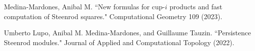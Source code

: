 
{
	\begin{frame}
		\vskip 5cm
		\begin{center}
		\end{center}

	\bigskip

	\footnotesize
	 Medina-Mardones, Anibal M. ``New formulas for cup-$i$ products and fast computation of Steenrod squares." Computational Geometry 109 (2023).

	\medskip
	 Umberto Lupo, Anibal M. Medina-Mardones, and Guillaume Tauzin. ``Persistence Steenrod modules." Journal of Applied and Computational Topology (2022).
	\end{frame}
}